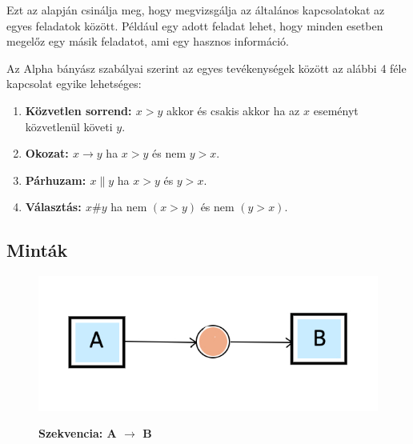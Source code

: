 Ezt az alapján csinálja meg, hogy megvizsgálja az általános kapcsolatokat az egyes feladatok között. Például egy adott feladat lehet, hogy minden esetben megelőz egy másik feladatot, ami egy hasznos információ.

Az Alpha bányász szabályai szerint az egyes tevékenységek között az alábbi 4 féle kapcsolat egyike lehetséges:
\begin{enumerate}
\item \textbf{Közvetlen sorrend: $x > y$} akkor és csakis akkor ha az $x$ eseményt közvetlenül követi $y$.
\item \textbf{Okozat: $x \rightarrow y$} ha $x > y$ és nem $y > x$.
\item \textbf{Párhuzam: $x \parallel y$} ha $x > y$ és $y > x$.
\item \textbf{Választás: $x \# y$} ha nem $(x > y)$ és nem $(y > x)$.
\end{enumerate}

\subsection{Minták}

\begin{figure}[h!]
\begin{center}
\caption{\textbf{Szekvencia: A $\rightarrow$ B}}
\includegraphics[width=8truecm, height=4truecm]{images/img_alpha_seq}\\
\label{fig:example}
\end{center}
\end{figure}

